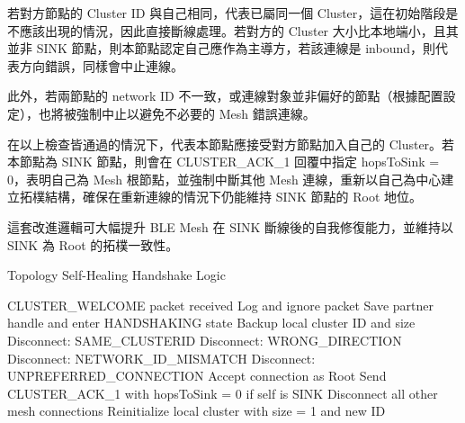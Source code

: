 \begin{ZhChapter}
若對方節點的 Cluster ID 與自己相同，代表已屬同一個 Cluster，這在初始階段是不應該出現的情況，因此直接斷線處理。若對方的 Cluster 大小比本地端小，且其並非 SINK 節點，則本節點認定自己應作為主導方，若該連線是 inbound，則代表方向錯誤，同樣會中止連線。

此外，若兩節點的 network ID 不一致，或連線對象並非偏好的節點（根據配置設定），也將被強制中止以避免不必要的 Mesh 錯誤連線。

在以上檢查皆通過的情況下，代表本節點應接受對方節點加入自己的 Cluster。若本節點為 SINK 節點，則會在 CLUSTER\_ACK\_1 回覆中指定 hopsToSink = 0，表明自己為 Mesh 根節點，並強制中斷其他 Mesh 連線，重新以自己為中心建立拓樸結構，確保在重新連線的情況下仍能維持 SINK 節點的 Root 地位。

這套改進邏輯可大幅提升 BLE Mesh 在 SINK 斷線後的自我修復能力，並維持以 SINK 為 Root 的拓樸一致性。

\begin{algorithm}[H]
\caption{Topology Self-Healing Handshake Logic}
\label{alg: Topology Self-Healing Handshake Logic}
\begin{algorithmic}[1]
\Require CLUSTER\_WELCOME packet received
    \State Log and ignore packet
\Else
    \State Save partner handle and enter HANDSHAKING state
    \State Backup local cluster ID and size
        \State Disconnect: SAME\_CLUSTERID
            \State Disconnect: WRONG\_DIRECTION
        \EndIf
        \State Disconnect: NETWORK\_ID\_MISMATCH
        \State Disconnect: UNPREFERRED\_CONNECTION
    \Else
        \State Accept connection as Root
        \State Send CLUSTER\_ACK\_1 with hopsToSink = 0 if self is SINK
        \State Disconnect all other mesh connections
        \State Reinitialize local cluster with size = 1 and new ID
    \EndIf
\EndIf
\end{algorithmic}
\end{algorithm}

\end{ZhChapter}